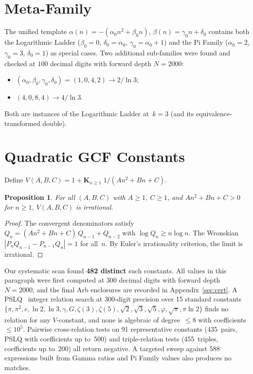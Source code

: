 \documentclass[11pt,a4paper]{article}
\theoremstyle{plain}
\newtheorem{proposition}[theorem]{Proposition}
\theoremstyle{definition}
\theoremstyle{remark}
\begin{document}
\section{Meta-Family}\label{sec:meta}

The unified template
$\alpha(n) = -(\alpha_0 n^2 + \beta_0 n)$,
$\beta(n) = \gamma_0 n + \delta_0$
contains both the Logarithmic Ladder
($\beta_0 = 0$, $\delta_0 = \alpha_0$, $\gamma_0 = \alpha_0 + 1$)
and the Pi Family
($\alpha_0 = 2$, $\gamma_0 = 3$, $\delta_0 = 1$)
as special cases.
Two additional sub-families were found and checked at $100$ decimal digits
with forward depth $N=2000$:
\begin{itemize}
  \item $(\alpha_0, \beta_0, \gamma_0, \delta_0) = (1,0,4,2)
    \to 2/\ln 3$;
  \item $(4,0,8,4) \to 4/\ln 3$.
\end{itemize}
Both are instances of the Logarithmic Ladder at~$k = 3$
(and its equivalence-transformed double).

\section{Quadratic GCF Constants}\label{sec:vquad}

Define $V(A,B,C) = 1 + \mathbf{K}_{n \ge 1}\; 1/(An^2 + Bn + C)$.

\begin{proposition}\label{prop:irrat}
For all $(A,B,C)$ with $A \ge 1$, $C \ge 1$, and
$An^2 + Bn + C > 0$ for $n \ge 1$, $V(A,B,C)$ is irrational.
\end{proposition}

\begin{proof}
The convergent denominators satisfy
$Q_n = (An^2{+}Bn{+}C)\,Q_{n-1} + Q_{n-2}$
with $\log Q_n \gtrsim n \log n$.
The Wronskian $|P_n Q_{n-1} - P_{n-1} Q_n| = 1$ for all~$n$.
By Euler's irrationality criterion, the limit is irrational.
\end{proof}

Our systematic scan found \textbf{482 distinct} such constants.
All values in this paragraph were first computed at $300$ decimal digits with
forward depth $N=2000$, and the final Arb enclosures are recorded in
Appendix~\ref{sec:cert}.
A PSLQ~\cite{ferguson1999} integer relation search at 300-digit precision over 15
standard constants
$\{\pi, \pi^2, e, \ln 2, \ln 3, \gamma, G, \zeta(3), \zeta(5),
\sqrt{2}, \sqrt{3}, \sqrt{5}, \varphi, \sqrt{\pi}, \pi\ln 2\}$
finds no relation for any $V$-constant, and none is algebraic of
degree~$\le 8$ with coefficients~$\le 10^5$.
Pairwise cross-relation tests on 91 representative constants
(435~pairs, PSLQ with coefficients up to~500) and triple-relation
tests (455~triples, coefficients up to~200) all return negative.
A targeted sweep against 588 expressions built from Gamma ratios
and Pi Family values also produces no matches.
\end{document}
